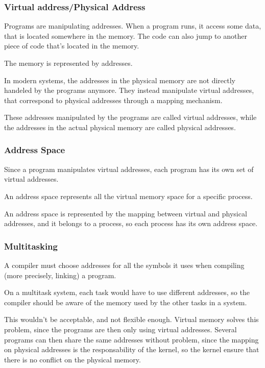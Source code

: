 \begin{frame}
  \frametitle{Virtual address/Physical Address}
  
  Programs are manipulating addresses. When a program runs, it access some data, that is located somewhere in the memory. The code can also jump to another piece of code that's located in the memory.

  \-

  The memory is represented by addresses.

  \-

  In modern systems, the addresses in the physical memory are not directly handeled by the programs anymore. They instead manipulate virtual addresses, that correspond to physical addresses through a mapping mechanism.

  \-

  These addresses manipulated by the programs are called virtual addresses, while the addresses in the actual physical memory are called physical addresses.

\end{frame}


\begin{frame}
  \frametitle{Address Space}

  Since a program manipulates virtual addresses, each program has its own set of virtual addresses.

  \-

  An address space represents all the virtual memory space for a specific process.

  \-

  An address space is represented by the mapping between virtual and physical addresses, and it belongs to a process, so each process has its own address space.

\end{frame}

\begin{frame}
  \frametitle{Multitasking}

  A compiler must choose addresses for all the symbols it uses when compiling (more precisely, linking) a program.

  \-

  On a multitask system, each task would have to use different addresses, so the compiler should be aware of the memory used by the other tasks in a system.

  \-

  This wouldn't be acceptable, and not flexible enough. Virtual memory solves this problem, since the programs are then only using virtual addresses. Several programs can then share the same addresses without problem, since the mapping on physical addresses is the responsability of the kernel, so the kernel ensure that there is no conflict on the physical memory.

\end{frame}


